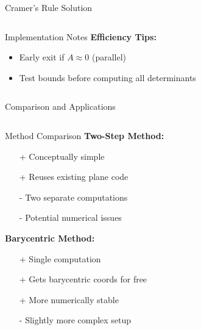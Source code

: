 \begin{frame}{Cramer's Rule Solution}
\begin{columns}
\begin{column}{0.5\textwidth}
\begin{conceptbox}{Implementation Notes}
                \vspace{0.3cm}
                \textbf{Efficiency Tips:}
                \begin{itemize}
                    \item Early exit if $A \approx 0$ (parallel)
                    \item Test bounds before computing all determinants
                \end{itemize}
            \end{conceptbox}
        \end{column}
    \end{columns}
\end{frame}

\begin{frame}{Comparison and Applications}
    \begin{columns}
        \begin{column}{0.5\textwidth}
            \begin{conceptbox}{Method Comparison}
                \textbf{Two-Step Method:}
                \begin{itemize}
                    \item[+] Conceptually simple
                    \item[+] Reuses existing plane code
                    \item[-] Two separate computations
                    \item[-] Potential numerical issues
                \end{itemize}
                
                \vspace{0.5cm}
                \textbf{Barycentric Method:}
                \begin{itemize}
                    \item[+] Single computation
                    \item[+] Gets barycentric coords for free
                    \item[+] More numerically stable
                    \item[-] Slightly more complex setup
                \end{itemize}
            \end{conceptbox}
        \end{column}
        \begin{column}{0.5\textwidth}
\end{column}
\end{columns}
\end{frame}
